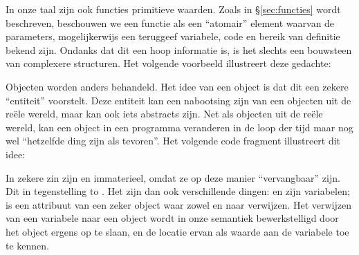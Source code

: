 In onze taal zijn ook functies primitieve waarden. Zoals in §\ref{sec:functies} wordt beschreven, beschouwen we een functie als een “atomair” element waarvan de parameters, mogelijkerwijs een teruggeef variabele, code en bereik van definitie bekend zijn. Ondanks dat dit een hoop informatie is, is het slechts een bouwsteen van complexere structuren. Het volgende voorbeeld illustreert deze gedachte:

\begin{NoBreak}
  \codeFragmentCaption
\end{NoBreak}

Objecten worden anders behandeld. Het idee van een object is dat dit een zekere “entiteit” voorstelt. Deze entiteit kan een nabootsing zijn van een objecten uit de reële wereld, maar kan ook iets abstracts zijn. Net als objecten uit de reële wereld, kan een object in een programma veranderen in de loop der tijd maar nog wel “hetzelfde ding zijn als tevoren”. Het volgende code fragment illustreert dit idee:

\begin{NoBreak}
  \codeFragmentCaption
\end{NoBreak}

In zekere zin zijn  en  immaterieel, omdat ze op deze manier “vervangbaar” zijn. Dit in tegenstelling to . Het zijn dan ook verschillende dingen:  en  zijn variabelen;  is een attribuut van een zeker object waar zowel  en  naar verwijzen.
Het verwijzen van een variabele naar een object wordt in onze semantiek bewerkstelligd door het object ergens op te slaan, en de locatie ervan als waarde aan de variabele toe te kennen.

